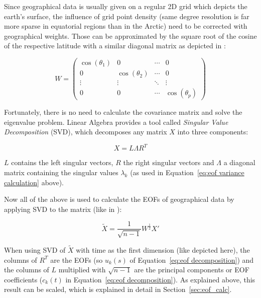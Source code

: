 Since geographical data is usually given on a regular 2D grid which depicts the earth's surface, the influence of grid point density (same degree resolution is far more sparse in equatorial regions than in the Arctic) need to be corrected with geographical weights. 
Those can be approximated by the square root of the cosine of the respective latitude \cite{hannachi_primer_nodate, vietinghoffdiss} with a similar diagonal matrix as depicted in \cite{hannachi_primer_nodate}: 

\begin{equation}
  W = \begin{pmatrix}
    \cos(\theta_1) & 0 & \cdots & 0 \\
0 & \cos(\theta_2) & \cdots & 0 \\
\vdots & \vdots & \ddots & \vdots \\
0 & 0 & \cdots & \cos(\theta_p)
\end{pmatrix}
  \label{eq:geographical weighting}
\end{equation}
  

Fortunately, there is no need to calculate the covariance matrix and solve the eigenvalue problem. 
Linear Algebra provides a tool called \textit{Singular Value Decomposition} (SVD), which decomposes any matrix $X$ into three components: 

\begin{equation}
  X = L \Lambda R^T 
  \label{eq:svd definition}
\end{equation}

$L$ contains the left singular vectors, $R$ the right singular vectors and $\Lambda$ a diagonal matrix containing the singular values $\lambda_k$ (as used in Equation~\ref{eq:eof variance calculation} above). 

Now all of the above is used to calculate the EOFs of geographical data by applying SVD to the matrix (like in ): 

\begin{equation}
  \tilde{X} = \frac{1}{\sqrt{n - 1}} W^{\frac{1}{2}} X' 
  \label{eq:complete data preperation}
\end{equation}


When using SVD of $\tilde{X}$ with time as the first dimension (like depicted here), the columns of $R^T$ are the EOFs (so $u_k(s)$ of Equation~\ref{eq:eof decomposition}) and the columns of $L$ multiplied with $\sqrt{n - 1}$ are the principal components or EOF coefficients ($c_k(t)$ in Equation~\ref{eq:eof decomposition}).
As explained above, this result can be scaled, which is explained in detail in Section~\ref{sec:eof_calc}.




